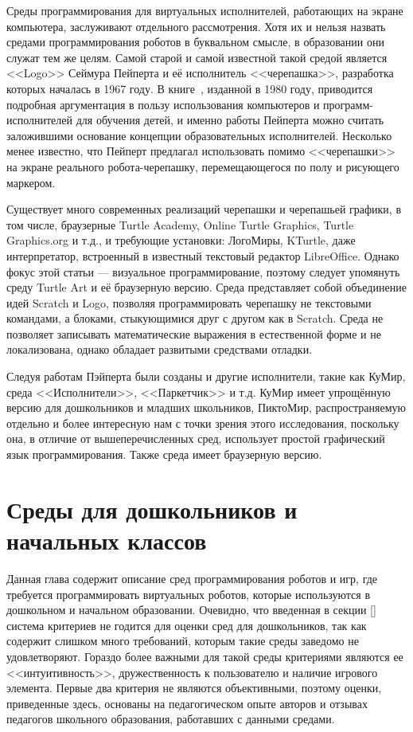 \documentclass[a5paper]{article}
\begin{document}
Среды программирования для виртуальных исполнителей, работающих на экране компьютера, заслуживают отдельного 
рассмотрения. Хотя их и нельзя назвать средами программирования роботов в буквальном смысле, в образовании 
они служат тем же целям. Самой старой и самой известной такой средой является <<Logo>> Сеймура Пейперта и 
её исполнитель <<черепашка>>, разработка которых началась в 1967 году. В книге~\cite{papert1980mindstorms}, 
изданной в 1980 году, приводится подробная аргументация в пользу использования компьютеров и 
программ-исполнителей для обучения детей, и именно работы Пейперта можно считать заложившими 
основание концепции образовательных исполнителей. Несколько менее известно, что Пейперт предлагал 
использовать помимо <<черепашки>> на экране реального робота-черепашку, 
перемещающегося по полу и рисующего маркером.

Существует много современных реализаций черепашки и черепашьей графики, в том числе, браузерные Turtle Academy, 
Online Turtle Graphics, Turtle Graphics.org и т.д., и требующие установки: ЛогоМиры, KTurtle, даже интерпретатор, 
встроенный в известный текстовый редактор LibreOffice. Однако фокус этой статьи --- визуальное программирование, 
поэтому следует упомянуть среду Turtle Art и её браузерную версию. Среда представляет собой объединение 
идей Scratch и Logo, позволяя программировать черепашку не текстовыми командами, а блоками, стыкующимися друг 
с другом как в Scratch. Среда не позволяет записывать математические выражения в естественной форме и 
не локализована, однако обладает развитыми средствами отладки.

Следуя работам Пэйперта были созданы и другие исполнители, такие как КуМир, среда <<Исполнители>>, <<Паркетчик>> и т.д. 
КуМир имеет упрощённую версию для дошкольников и младших школьников, ПиктоМир, распространяемую отдельно и более 
интересную нам  с точки зрения этого исследования, поскольку она, в отличие от вышеперечисленных сред, использует 
простой графический язык программирования. Также среда имеет браузерную версию.

\section{Среды для дошкольников и начальных классов}

Данная глава содержит описание сред программирования роботов и игр, где требуется программировать виртуальных роботов, 
которые используются в дошкольном и начальном образовании. Очевидно, что введенная в секции [] система критериев 
не годится для оценки сред для дошкольников, так как содержит слишком много требований, которым такие среды 
заведомо не удовлетворяют. Гораздо более важными для такой среды критериями являются ее <<интуитивность>>, 
дружественность к пользователю и наличие игрового элемента. Первые два критерия не являются объективными, поэтому оценки, 
приведенные здесь, основаны на педагогическом опыте авторов и отзывах педагогов школьного образования, 
работавших с данными средами.
\end{document}
